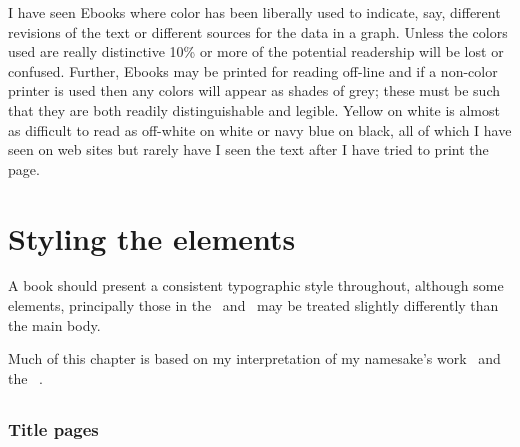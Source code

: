 \documentclass[10pt,a4paper,extrafontsizes]{memoir}
\begin{document}
\begin{paracol}{2}
    I have seen Ebooks where color has been liberally used to indicate, say, 
different revisions of the text or different sources for the data in a graph. 
Unless the colors used are really distinctive 10\% or more of the potential 
readership will be lost or confused. Further,
Ebooks may be printed for reading off-line and if a non-color printer is
used then any colors will appear as shades of grey; these must be such that
they are both readily distinguishable and legible. Yellow on white is almost
as difficult to read as off-white on white or navy blue on black, all of
which I have seen on web sites but rarely have I seen the text after I 
have tried to print the page.
\end{paracol}



\chapter{Styling the elements}

\begin{paracol}{2}
\switchEng
    A book should present a consistent typographic style throughout, although
some elements, principally those in the \pixfrontmatter\ and \pixbackmatter\ 
may be treated slightly differently than the main body. 

    Much of this chapter is based on my interpretation of my namesake's 
work~\autocite{ADRIANWILSON93} and the \btitle{Chicago Manual of Style}~\autocite{CMS}.
\end{paracol}

\section{\prFrontmatter}

\subsection{Title pages}
\end{document}
